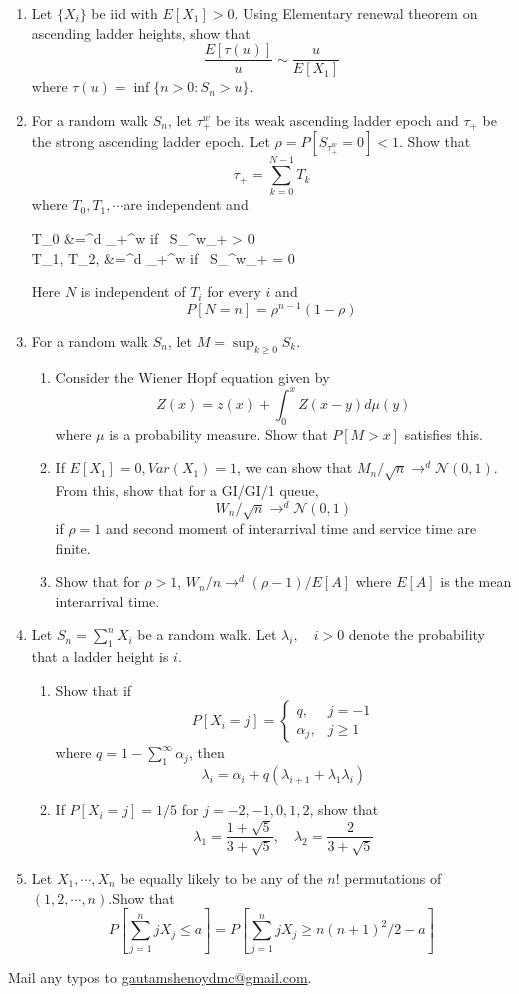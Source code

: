 \documentclass[a4paper,10pt]{article}
\begin{document}
\begin{enumerate}
	\item Let $\{X_i\}$ be iid  with $E[X_1]> 0$. Using Elementary renewal theorem on ascending ladder heights, show that
	\[\frac{E[\tau (u)]}{u} \sim \frac{u}{E[X_1]}\]
	where $\tau (u) = \inf \{n>0: S_n > u\}$.
	\item For a random walk $S_n$, let $\tau^w_+$ be its weak ascending ladder epoch and $\tau_+$ be the strong ascending ladder epoch. Let $\rho = P[S_{\tau^w_+} = 0] < 1$. Show that 
	\[\tau_+ = \sum_{k=0}^{N-1}T_k\]
	where $T_0, T_1, \cdots $are independent and 
	\begin{flalign*}
	T_0 &=^d \tau_+^w \quad \mbox{if } S_{\tau^w_+} > 0 \\
	T_1, T_2, \cdots &=^d \tau_+^w \quad \mbox{if } S_{\tau^w_+} = 0
	\end{flalign*}
	Here $N$ is independent of $T_i$ for every $i$ and 
	\[P[N=n] = \rho^{n-1}(1-\rho)\]
	
	\item For a random walk $S_n$, let $M=\sup_{k \geq 0}S_k$. 
	\begin{enumerate}
		\item Consider the Wiener Hopf equation given by
		\[Z(x) = z(x) + \int_0^x Z(x-y)d\mu(y)\] 
		where $\mu$ is a probability measure. Show that $P[M > x]$ satisfies this.
		\item If $E[X_1]=0, Var(X_1)=1$, we can show that $M_n/\sqrt{n} \to^d \mathcal{N}(0,1)$. From this, show that for a GI/GI/1 queue,
		\[W_n/\sqrt{n} \to^d \mathcal{N}(0,1) \]
		if $\rho = 1$ and second moment of interarrival time and service time are finite.
		\item Show that for $\rho > 1$, $W_n/n \to^d (\rho - 1)/E[A]$ where $E[A]$ is the mean interarrival time.
	\end{enumerate}
	
	\item Let $S_n = \sum_1^n X_i$ be a random walk. Let $\lambda_i,\quad i>0$ denote the probability that a ladder height is $i$. 
	\begin{enumerate}
		\item Show that if
		\[P[X_i = j] = \left\{\begin{array}{lc}
			q,  & j=-1 \\
			\alpha_j, & j \geq 1
		\end{array}\right.\]
		where $q=1- \sum_1^\infty \alpha_j$, then
		\[\lambda_i = \alpha_i + q(\lambda_{i+1} +\lambda_1\lambda_i)\]
		\item If $P[X_i=j] = 1/5$ for $j=-2,-1,0,1,2$, show that 
		\[\lambda_1 = \frac{1+\sqrt{5}}{3+\sqrt{5}}, \quad \lambda_2 = \frac{2}{3+\sqrt{5}}\]
	\end{enumerate}
	
	\item Let $X_1,\cdots, X_n$ be equally likely to be any of the $n!$ permutations of $(1,2,\cdots, n)$.Show that
	\[P\left[\sum_{j=1}^n jX_j \leq a\right] = P\left[\sum_{j=1}^n jX_j \geq n(n+1)^2/2-a\right]\]
\end{enumerate}

Mail any typos to \url{gautamshenoydmc@gmail.com}.
\end{document}
